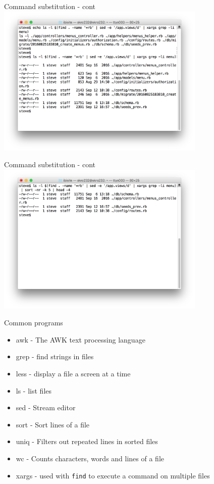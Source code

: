 \documentclass[t]{beamer}
\begin{document}
\begin{frame}{Command substitution - cont}
  \includegraphics[width=10cm,scale=0.4]{images/cs-1.png}
  \note{}
\end{frame}

\begin{frame}{Command substitution - cont}
  \includegraphics[width=10cm,scale=0.4]{images/cs-2.png}
  \note{}
\end{frame}

\begin{frame}{Common programs}
  \begin{itemize}
  \item awk - The AWK text processing language
  \item grep - find strings in files
  \item less - display a file a screen at a time
  \item ls - list files
  \item sed - Stream editor
  \item sort - Sort lines of a file
  \item uniq - Filters out repeated lines in sorted files
  \item wc - Counts characters, words and lines of a file
  \item xargs - used with \texttt{find} to execute a command on
    multiple files
  \end{itemize}
  \note{}
\end{frame}
\end{document}
